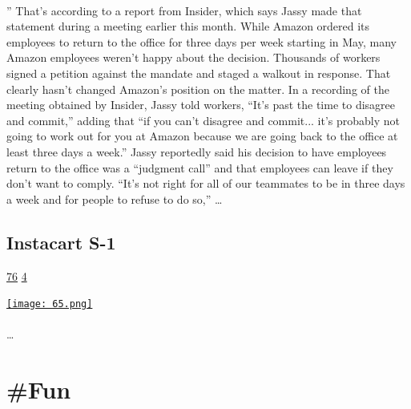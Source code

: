 \documentclass[10pt,a4paper]{article}
\begin{document}
\begin{multicols}{2}
\paragraph{}
” That’s according to a report from Insider, which says Jassy made that statement during a meeting earlier this month.
While Amazon ordered its employees to return to the office for three days per week starting in May, many Amazon employees weren’t happy about the decision. Thousands of workers signed a petition against the mandate and staged a walkout in response.
That clearly hasn’t changed Amazon’s position on the matter. In a recording of the meeting obtained by Insider, Jassy told workers, “It’s past the time to disagree and commit,” adding that “if you can’t disagree and commit... it’s probably not going to work out for you at Amazon because we are going back to the office at least three days a week.”
Jassy reportedly said his decision to have employees return to the office was a “judgment call” and that employees can leave if they don’t want to comply. “It’s not right for all of our teammates to be in three days a week and for people to refuse to do so,”
\dots\par
\noindent\begin{minipage}{\linewidth}
\medskip
\subsection{Instacart S-1}
\textsc{\footnotesize
{\scriptsize\faThumbsOUp}\space 
\href{http://news.ycombinator.com/item?id=37265182\&utm\_term=comment}{76} 
{\scriptsize\faComments}\space 
\href{http://news.ycombinator.com/item?id=37265182\&utm\_term=comment}{4} 
}
\par\medskip\noindent
\href{https://www.sec.gov/Archives/edgar/data/1579091/000119312523221345/d55348ds1.htm?utm\_source=hackernewsletter\&utm\_medium=email\&utm\_term=startup\_news}{
    \texttt{[image: 65.png]}
}
\end{minipage}
\paragraph{}

\dots\par
\end{multicols}

\newpage
\section{\#Fun}
\end{document}
